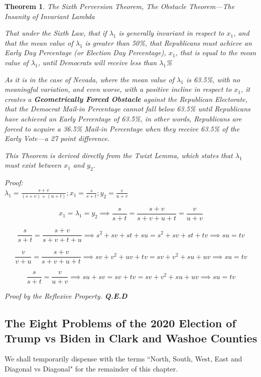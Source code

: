 \documentclass[preprint,13pt]{elsarticle}
\newtheorem{theorem}{Theorem}[section]
\begin{document}
\newpage
\begin{theorem}{The Sixth Perversion Theorem, The Obstacle Theorem---The Insanity of Invariant Lambda}

That under the Sixth Law, that if $\lambda_{1}$ is generally invariant in respect to $x_{1}$, and that the mean value of $\lambda_{1}$ is greater than 50\%, that Republicans must achieve an Early Day Percentage (or Election Day Percentage), $x_{1}$, that is equal to the mean value of $\lambda_{1}$, until Democrats will receive less than $\lambda_{1}$\%

As it is in the case of Nevada, where the mean value of $\lambda_{1}$ is 63.5\%, with no meaningful variation, and even worse, with a positive incline in respect to $x_{1}$, it creates a \textbf{ Geometrically Forced Obstacle} against the Republican Electorate, that the Democrat Mail-in Percentage cannot fall below 63.5\% until Republicans have achieved an Early Percentage of 63.5\%, in other words, Republicans are forced to acquire a 36.5\% Mail-in Percentage when they receive 63.5\% of the Early Vote---a 27 point difference.

This Theorem is derived directly from the Twixt Lemma, which states that $\lambda_{1}$ must exist between $x_{1}$ and $y_{2}$.

Proof:\\
$\lambda_{1}=\frac{s+v}{(s+v)+(u+t)}; x_{1}=\frac{s}{s+t}; y_{2}=\frac{v}{u+v}$

$$x_{1}=\lambda_{1}=y_{2} \implies \frac{s}{s+t}=\frac{s+v}{s+v+u+t}=\frac{v}{u+v}$$

$$\frac{s}{s+t}=\frac{s+v}{s+v+t+u} \implies s^2+sv+st+su=s^2+sv+st+tv \implies  su=tv$$

$$\frac{v}{v+u}=\frac{s+v}{s+v+u+t} \implies sv+v^2+uv+tv = sv+v^2+su+uv \implies su=tv$$

$$\frac{s}{s+t}=\frac{v}{u+v} \implies su+sv = sv+tv = sv+v^2+su+uv \implies su=tv$$
\begin{flushright}
Proof by the Reflexive Property.
\textbf{Q.E.D}
\end{flushright}
\end{theorem}
\newpage
\subsection{The Eight Problems of the 2020 Election of Trump vs Biden in Clark and Washoe Counties}
We shall temporarily dispense with the terms ``North, South, West, East and Diagonal vs Diagonal" for the remainder of this chapter.
\end{document}
